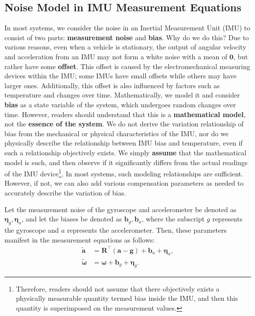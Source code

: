 \subsection{Noise Model in IMU Measurement Equations}
\label{sec:imu-noise}

In most systems, we consider the noise in an Inertial Measurement Unit (IMU) to consist of two parts: \textbf{measurement noise} and \textbf{bias}. Why do we do this? Due to various reasons, even when a vehicle is stationary, the output of angular velocity and acceleration from an IMU may not form a white noise with a mean of $\mathbf{0}$, but rather have some \textbf{offset}. This offset is caused by the electromechanical measuring devices within the IMU; some IMUs have small offsets while others may have larger ones. Additionally, this offset is also influenced by factors such as temperature and changes over time. Mathematically, we model it and consider \textbf{bias} as a state variable of the system, which undergoes random changes over time. However, readers should understand that this is a \textbf{mathematical model}, not the \textbf{essence of the system}. We do not derive the variation relationship of bias from the mechanical or physical characteristics of the IMU, nor do we physically describe the relationship between IMU bias and temperature, even if such a relationship objectively exists. We simply \textbf{assume} that the mathematical model is such, and then observe if it significantly differs from the actual readings of the IMU device\footnote{Therefore, readers should not assume that there objectively exists a physically measurable quantity termed bias inside the IMU, and then this quantity is superimposed on the measurement values.}. In most systems, such modeling relationships are sufficient. However, if not, we can also add various compensation parameters as needed to accurately describe the variation of bias.

Let the measurement noise of the gyroscope and accelerometer be denoted as $\boldsymbol{\eta}_g, \boldsymbol{\eta}_a$, and let the biases be denoted as $\mathbf{b}_g, \mathbf{b}_a$, where the subscript $g$ represents the gyroscope and $a$ represents the accelerometer. Then, these parameters manifest in the measurement equations as follows:
\begin{subequations}\label{eq:imu-measurement}
	\begin{align}
		\tilde{\mathbf{a}} &= \mathbf{R}^\top (\mathbf{a} - \mathbf{g}) + \mathbf{b}_a + \boldsymbol{\eta}_a, \\
		\tilde{\boldsymbol{\omega}} &= \boldsymbol{\omega} + \mathbf{b}_g + \boldsymbol{\eta}_g.
	\end{align}
\end{subequations}

